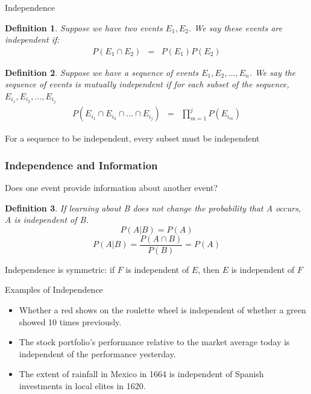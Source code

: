 \documentclass[handout]{beamer}
\newtheorem{defn}{Definition}
\numberwithin{equation}{section}
\begin{document}
\begin{frame}{Independence}

\begin{defn}
Suppose we have two events $E_{1}, E_{2}$.  We say these events are \alert{independent} if:
\begin{eqnarray}
P(E_{1}\cap E_{2}) & = & P(E_{1}) P( E_{2}) \nonumber 
\end{eqnarray}
\end{defn}

\end{frame}



\begin{frame}

\begin{defn}
Suppose we have a sequence of events $E_{1}, E_{2}, \hdots, E_{n}$.  We say the sequence of events is \alert{mutually independent} if for each subset of the sequence,  $E_{i_{1}}, E_{i_{2}}, \hdots, E_{i_{j}}$ 
\begin{eqnarray}
P(E_{i_{1}}\cap E_{i_{2}}\cap \hdots \cap E_{i_{j}}) & = & \prod_{m = 1}^{j} P(E_{i_{m}}) \nonumber 
\end{eqnarray}
\end{defn}

\alert{For a sequence to be independent, every subset must be independent }


\end{frame}


\begin{frame}
\frametitle{Independence and Information} 

Does one event provide \alert{information} about another event? \pause 

\begin{defn} 
If learning about B does not change the probability that A occurs, A is independent of B.
 $$P(A|B)=P(A)$$\pause
 $$P(A|B)=\frac{P(A\cap B)}{P(B)}=P(A)$$
\end{defn}
\pause

Independence is symmetric: if $F$ is independent of $E$, then
  $E$ is independent of $F$

\end{frame}


\begin{frame}{Examples of Independence}

\begin{itemize}
\item Whether a red shows on the roulette wheel is independent of whether a green showed 10 times previously.\pause
\item The stock portfolio's performance relative to the market average today is independent of the performance yesterday.\pause
\item The extent of rainfall in Mexico in 1664 is independent of Spanish investments in local elites in 1620. 
\end{itemize}
\end{frame}
\end{document}
